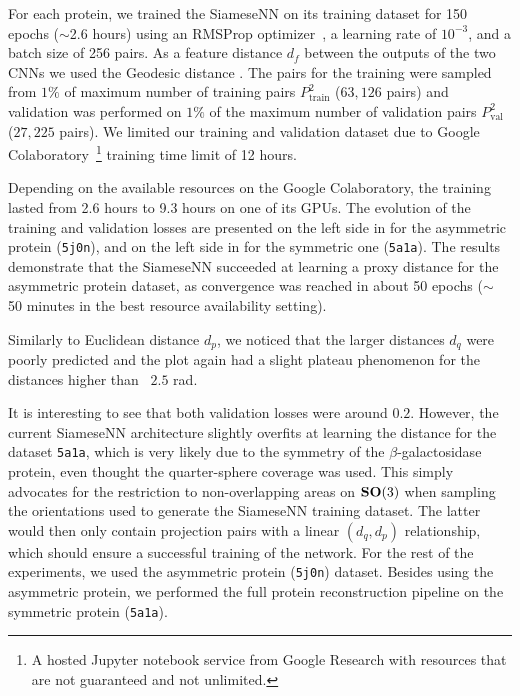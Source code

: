 For each protein, we trained the SiameseNN on its training dataset for 150 epochs ($\sim$2.6 hours) using an RMSProp optimizer~\cite{tieleman2012rmsprop}, a learning rate of $10^{-3}$, and a batch size of 256 pairs. 
As a feature distance $d_f$ between the outputs of the two CNNs we used the Geodesic distance .
The pairs for the training were sampled from $1\%$ of maximum number of training pairs $P_{\text{train}}^2$ ($63,126$ pairs) and validation was performed on $1\%$ of the maximum number of validation pairs $P_{\text{val}}^2$ ($27,225$ pairs). 
We limited our training and validation dataset due to Google Colaboratory~\footnote{A hosted Jupyter notebook service from Google Research with resources that are not guaranteed and not unlimited.} training time limit of 12 hours.

Depending on the available resources on the Google Colaboratory, the training lasted from 2.6 hours to 9.3 hours on one of its GPUs.
The evolution of the training and validation losses are presented on the left side in  for the asymmetric protein (\texttt{5j0n}), and on the left side in  for the symmetric one (\texttt{5a1a}).
The results demonstrate that the SiameseNN succeeded at learning a proxy distance for the asymmetric protein dataset, as convergence was reached in about 50 epochs ($\sim$ 50 minutes in the best resource availability setting).

Similarly to Euclidean distance $d_p$, we noticed that the larger distances $d_q$ were poorly predicted and the plot again had a slight plateau phenomenon for the distances higher than ~$2.5$ rad.

It is interesting to see that both validation losses were around $0.2$.
However, the current SiameseNN architecture slightly overfits at learning the distance for the dataset \texttt{5a1a}, which is very likely due to the symmetry of the $\beta$-galactosidase protein, even thought the quarter-sphere coverage was used.
This simply advocates for the restriction to non-overlapping areas on $\mathrm{\mathbf{SO}}(3)$ when sampling the orientations used to generate the SiameseNN training dataset.
The latter would then only contain projection pairs with a linear $(d_q,d_p)$ relationship, which should ensure a successful training of the network.
For the rest of the experiments, we used the asymmetric protein (\texttt{5j0n}) dataset.
Besides using the asymmetric protein, we performed the full protein reconstruction pipeline on the symmetric protein (\texttt{5a1a}).

